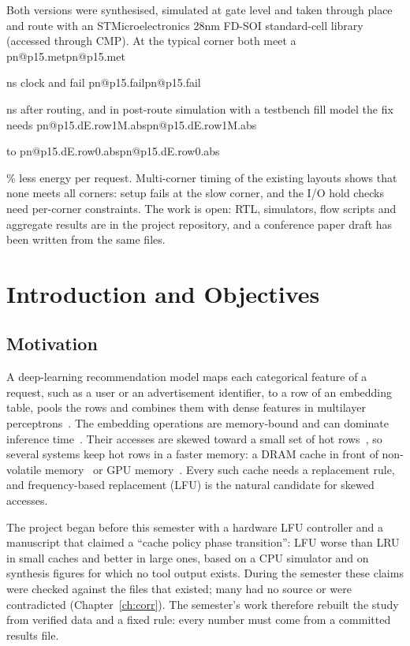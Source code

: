 \documentclass[11pt,a4paper]{report}
\makeatletter
\DeclareRobustCommand{\R}[1]{\ifcsname pn@#1\endcsname\csname pn@#1\endcsname\else
  \PackageError{report}{number key '#1' is not defined in macros.tex}{Run tools/make_paper_macros.py --target report}\fi}
\makeatother
\begin{document}
Both versions were synthesised, simulated at gate level and taken through place and route with an STMicroelectronics
28nm FD-SOI standard-cell library (accessed through CMP). At the typical corner both meet a \R{p15.met} ns clock and
fail \R{p15.fail} ns after routing, and in post-route simulation with a testbench fill model the fix needs
\R{p15.dE.row1M.abs} to \R{p15.dE.row0.abs}\% less energy per request. Multi-corner timing of the existing layouts shows that none meets all corners: setup fails at the slow corner, and the I/O hold checks need per-corner constraints. The work is open: RTL, simulators, flow scripts and aggregate results are in the
project repository, and a conference paper draft has been written from the same files.

\tableofcontents
\listoffigures
\listoftables

\cleardoublepage
{}

\chapter{Introduction and Objectives}\label{ch:intro}
\section{Motivation}
A deep-learning recommendation model maps each categorical feature of a request, such as a user or an advertisement
identifier, to a row of an embedding table, pools the rows and combines them with dense features in multilayer
perceptrons~\cite{naumov2019dlrm}. The embedding operations are memory-bound and can dominate inference
time~\cite{gupta2020architectural,ke2020recnmp}. Their accesses are skewed toward a small set of hot
rows~\cite{adnan2022fae,agarwal2023bagpipe}, so several systems keep hot rows in a faster memory: a DRAM cache in front
of non-volatile memory~\cite{eisenman2019bandana} or GPU memory~\cite{adnan2022fae,xie2022fleche,wei2022hps}. Every
such cache needs a replacement rule, and frequency-based replacement (LFU) is the natural candidate for skewed
accesses.

The project began before this semester with a hardware LFU controller and a manuscript that claimed a ``cache policy
phase transition'': LFU worse than LRU in small caches and better in large ones, based on a CPU simulator and on synthesis figures for which no tool output exists. During the semester these claims were checked against the files that existed; many had no source or were contradicted (Chapter~\ref{ch:corr}). The semester's work therefore rebuilt the study from verified
data and a fixed rule: every number must come from a committed results file.
\end{document}
